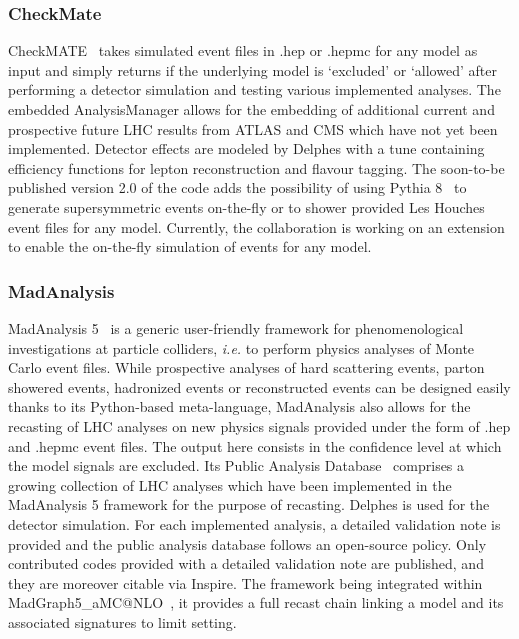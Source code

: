 \documentclass[11pt]{cernrep}
\begin{document}
\subsubsection{CheckMate}
CheckMATE~\cite{Drees:2013wra,Cacciari:2005hq} takes simulated event files in .hep or .hepmc for any model as input and simply returns if the underlying model is `excluded' or `allowed' after
performing a detector simulation and testing various implemented analyses. The embedded AnalysisManager allows for the embedding of additional current and
prospective future LHC results from ATLAS and CMS which have not yet been implemented.
Detector effects are modeled by Delphes with a tune containing efficiency functions for lepton reconstruction and flavour tagging. The soon-to-be published version 2.0 of the code adds the possibility of using Pythia 8~\cite{Sjostrand:2007gs} to
generate supersymmetric events on-the-fly or to shower provided Les Houches
event files for any model. Currently, the collaboration is working on an extension to enable the on-the-fly simulation of events for any model.


\subsubsection{MadAnalysis}
MadAnalysis 5~\cite{Conte:2012fm,Conte:2014zja} is a generic user-friendly
framework for phenomenological investigations at particle colliders, {\it i.e.}
to perform physics analyses of Monte Carlo event files. While prospective
analyses of hard scattering events, parton showered events, hadronized events or
reconstructed events can be designed easily thanks to its Python-based
meta-language, MadAnalysis also allows for the recasting of LHC analyses on new
physics signals provided under the form of .hep and .hepmc event files. The
output here consists in the confidence level at which the model signals are
excluded.
Its Public Analysis Database~\cite{Dumont:2014tja} comprises a growing
collection of LHC analyses which have been implemented in the MadAnalysis 5
framework for the purpose of recasting. Delphes is used for the detector
simulation. For each implemented analysis, a detailed validation note is
provided and the public analysis database follows an open-source policy. Only
contributed codes provided with a detailed validation note are published, and
they are moreover citable via Inspire. The framework being integrated within
MadGraph5\_aMC@NLO~\cite{Alwall:2014hca}, it provides a full recast chain linking a model
and its associated signatures to limit setting.
\end{document}
